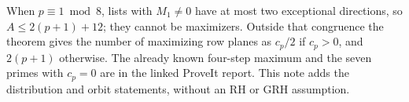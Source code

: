 \documentclass[11pt]{article}
\begin{document}
When $p\equiv1\bmod8$, lists with $M_1\ne0$ have at most two
exceptional directions, so $A\le2(p+1)+12$; they cannot be
maximizers. Outside that congruence the theorem gives the number
of maximizing row planes as $c_p/2$ if $c_p>0$, and $2(p+1)$
otherwise. The already known four-step maximum and the seven
primes with $c_p=0$ are in the linked ProveIt report. This note
adds the distribution and orbit statements, without an RH or
GRH assumption.
\end{document}
